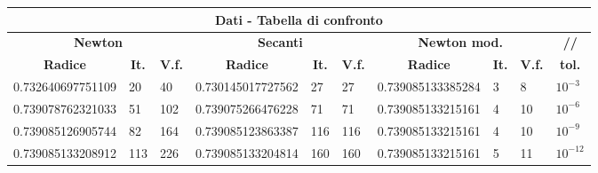 \documentclass[10pt,a4paper]{article}
\begin{document}
\begin{center}
  \setlength\tabcolsep{2pt}
  \begin{tabular}{|p{3cm} | p{1cm} | p{1cm} | p{3cm} | p{1cm} | p{1cm} | p{3cm} | p{1cm} | p{1cm} | p{1cm}|}
    \hline
    \multicolumn{10}{|c|}{\textbf{Dati - Tabella di confronto}}                                                                                                                                                               \\
    \hline
    \multicolumn{3}{|c|}{\textbf{Newton}} & \multicolumn{3}{|c|}{\textbf{Secanti}} & \multicolumn{3}{|c|}{\textbf{Newton mod.}} & \multicolumn{1}{c|}{\textbf{//}}                                                                                                                                                  \\
    \hline
    \multicolumn{1}{|c|}{\textbf{Radice}} & \multicolumn{1}{|c|}{\textbf{It.}}     & \multicolumn{1}{|c|}{\textbf{V.f.}}
                                          & \multicolumn{1}{|c|}{\textbf{Radice}}  & \multicolumn{1}{|c|}{\textbf{It.}}         & \multicolumn{1}{|c|}{\textbf{V.f.}}
                                          & \multicolumn{1}{|c|}{\textbf{Radice}}  & \multicolumn{1}{|c|}{\textbf{It.}}         & \multicolumn{1}{|c|}{\textbf{V.f.}}
                                          & \multicolumn{1}{c|}{\textbf{tol.}}                                                                                                                                                \\
    \hline
    0.732640697751109                     & 20                                     & 40                                         & 0.730145017727562                   & 27  & 27  & 0.739085133385284 & 3 & 8  & $ 10^{-3} $  \\
    0.739078762321033                     & 51                                     & 102                                        & 0.739075266476228                   & 71  & 71  & 0.739085133215161 & 4 & 10 & $ 10^{-6} $  \\
    0.739085126905744                     & 82                                     & 164                                        & 0.739085123863387                   & 116 & 116 & 0.739085133215161 & 4 & 10 & $ 10^{-9} $  \\
    0.739085133208912                     & 113                                    & 226                                        & 0.739085133204814                   & 160 & 160 & 0.739085133215161 & 5 & 11 & $ 10^{-12} $ \\
    \hline
  \end{tabular}
  \newline
\end{center}
\end{document}
